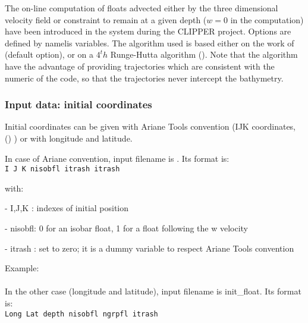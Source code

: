\documentclass[../tex_main/NEMO_manual]{subfiles}
\begin{document}

The on-line computation of floats advected either by the three dimensional velocity field or constraint to
remain at a given depth ($w = 0$ in the computation) have been introduced in the system during the CLIPPER project.
Options are defined by  namelis variables.
The algorithm used is based either on the work of \cite{Blanke_Raynaud_JPO97} (default option),
or on a $4^th$ Runge-Hutta algorithm ().
Note that the \cite{Blanke_Raynaud_JPO97} algorithm have the advantage of providing trajectories which
are consistent with the numeric of the code, so that the trajectories never intercept the bathymetry.

\subsubsection{Input data: initial coordinates}

Initial coordinates can be given with Ariane Tools convention
(IJK coordinates, () ) or with longitude and latitude.

In case of Ariane convention, input filename is .
Its format is: \\
{\scriptsize \texttt{I J K nisobfl itrash itrash}}

\noindent with:

 - I,J,K  : indexes of initial position

 - nisobfl: 0 for an isobar float, 1 for a float following the w velocity  

 - itrash : set to zero; it is a dummy variable to respect Ariane Tools convention

\noindent Example: \\
 \\

In the other case (longitude and latitude), input filename is init\_float.
Its format is: \\
{\scriptsize \texttt{Long Lat depth nisobfl ngrpfl itrash}}
\end{document}
